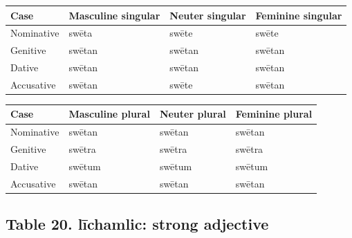 \par\begingroup
\fontsize{10.5}{13.2}\selectfont
\setlength{\LTleft}{0pt}\setlength{\LTright}{\fill}
\noindent
\begin{tabular}{@{}>{\raggedright\arraybackslash}p{22.0mm}>{\raggedright\arraybackslash}p{31.188mm}>{\raggedright\arraybackslash}p{31.188mm}>{\raggedright\arraybackslash}p{31.188mm}@{}}
\toprule
\textbf{Case} & \textbf{Masculine singular} & \textbf{Neuter singular} & \textbf{Feminine singular} \\
\midrule
Nominative & swēta & swēte & swēte \\
Genitive & swētan & swētan & swētan \\
Dative & swētan & swētan & swētan \\
Accusative & swētan & swēte & swētan \\
\bottomrule
\end{tabular}
\par\endgroup
\par\addvspace{5pt}
\par\begingroup
\fontsize{10.5}{13.2}\selectfont
\setlength{\LTleft}{0pt}\setlength{\LTright}{\fill}
\noindent
\begin{tabular}{@{}>{\raggedright\arraybackslash}p{22.0mm}>{\raggedright\arraybackslash}p{31.188mm}>{\raggedright\arraybackslash}p{31.188mm}>{\raggedright\arraybackslash}p{31.188mm}@{}}
\toprule
\textbf{Case} & \textbf{Masculine plural} & \textbf{Neuter plural} & \textbf{Feminine plural} \\
\midrule
Nominative & swētan & swētan & swētan \\
Genitive & swētra & swētra & swētra \\
Dative & swētum & swētum & swētum \\
Accusative & swētan & swētan & swētan \\
\bottomrule
\end{tabular}
\par\endgroup

\subsection*{Table 20. līchamlic: strong adjective}

